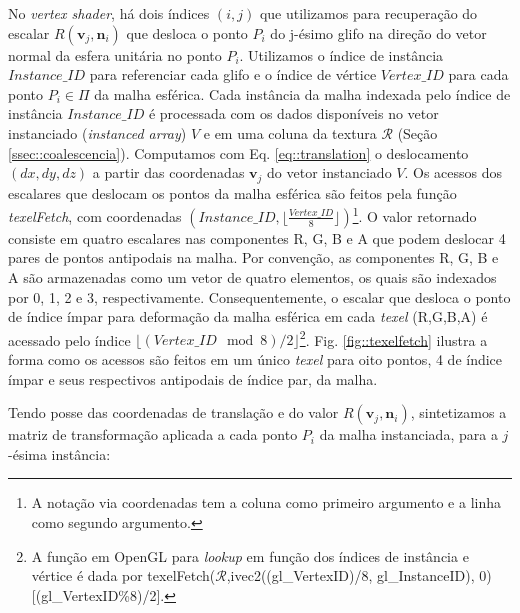 No \textit{vertex shader}, há dois índices $(i,j)$ que utilizamos para recuperação do escalar $R(\mathbf{v}_j , \mathbf{n}_i)$  que desloca o ponto $P_i$ do j-ésimo glifo na direção do vetor normal da esfera unitária no ponto $P_i$. Utilizamos o índice de instância $Instance\_ID$ para referenciar cada glifo e o índice de vértice $Vertex\_ID$ para cada ponto $P_i \in \Pi$ da malha esférica. Cada instância da malha indexada pelo índice de instância  $Instance\_ID$ é processada com os dados disponíveis no vetor instanciado (\textit{instanced array}) $V$ e em uma coluna da textura $\boldsymbol{\mathscr{R}}$ (Seção \ref{ssec::coalescencia}). Computamos com Eq. \ref{eq::translation} o deslocamento $(dx, dy, dz)$ a partir das coordenadas $\mathbf{v}_j$ do vetor instanciado $V$. Os acessos dos escalares que deslocam os pontos da malha esférica são feitos pela função \textit{texelFetch}, com coordenadas $(Instance\_ID, \lfloor\frac{Vertex\_ID}{8} \rfloor)$\footnote{A notação via coordenadas tem a coluna como primeiro argumento e a linha como segundo argumento.}. O valor retornado consiste em quatro escalares nas componentes R, G, B e A que podem deslocar 4 pares de pontos antipodais na malha. Por convenção, as componentes R, G, B e A são armazenadas como um vetor de quatro elementos, os quais são indexados por 0, 1, 2 e 3, respectivamente. Consequentemente, o escalar que desloca o ponto de índice ímpar para deformação da malha esférica em cada \textit{texel} (R,G,B,A) é acessado pelo índice $\lfloor (Vertex\_ID \mod{8})/2 \rfloor$\footnote{A função em OpenGL para \textit{lookup} em função dos índices de instância e vértice é dada por texelFetch($\boldsymbol{\mathscr{R}}$,ivec2((gl\_VertexID)/8, gl\_InstanceID), 0)[(gl\_VertexID\%8)/2].}. Fig. \ref{fig::texelfetch} ilustra a forma como os acessos são feitos em um único \textit{texel} para oito pontos, 4 de índice ímpar e seus respectivos antipodais de índice par, da malha. 

 Tendo posse das coordenadas de translação e do valor $R(\mathbf{v}_j, \mathbf{n}_i)$, sintetizamos a matriz de transformação aplicada a cada ponto $P_i$ da malha instanciada, para a $j$-ésima instância:

